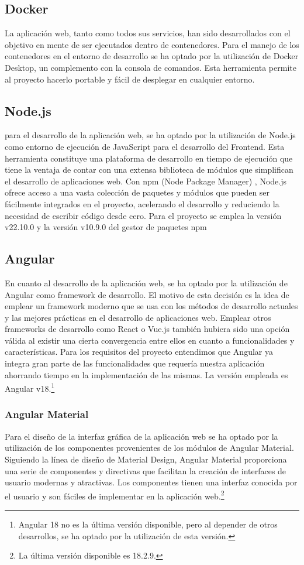 \documentclass[12pt, a4paper, twoside]{article}
\begin{document}
\subsection{Docker}
La aplicación web, tanto como todos sus servicios, han sido desarrollados con el objetivo en mente de ser ejecutados dentro de contenedores.
Para el manejo de los contenedores en el entorno de desarrollo se ha optado por la utilización de Docker Desktop, un complemento con la consola de comandos.
Esta herramienta permite al proyecto hacerlo portable y fácil de desplegar en cualquier entorno.
\subsection{Node.js}
\cite{nodejs}
para el desarrollo de la aplicación web, se ha optado por la utilización de Node.js como entorno de ejecución de JavaScript para el desarrollo del Frontend.
Esta herramienta constituye una plataforma de desarrollo en tiempo de ejecución que tiene la ventaja de contar con una extensa biblioteca de módulos que simplifican el desarrollo de aplicaciones web.
Con npm (Node Package Manager) \cite{npm}, Node.js ofrece acceso a una vasta colección de paquetes y módulos que pueden ser fácilmente integrados en el proyecto, acelerando el desarrollo y reduciendo la necesidad de escribir código desde cero.
Para el proyecto se emplea la versión v22.10.0 y la versión v10.9.0 del gestor de paquetes npm
\subsection{Angular}
\cite{angular}
En cuanto al desarrollo de la aplicación web, se ha optado por la utilización de Angular como framework de desarrollo.
El motivo de esta decisión es la idea de emplear un framework moderno que se usa con los métodos de desarrollo actuales y las mejores prácticas en el desarrollo de aplicaciones web.
Emplear otros frameworks de desarrollo como React o Vue.js también hubiera sido una opción válida al existir una cierta convergencia entre ellos en cuanto a funcionalidades y características.
Para los requisitos del proyecto entendimos que Angular ya integra gran parte de las funcionalidades que requería nuestra aplicación ahorrando tiempo en la implementación de las mismas. La versión empleada es Angular v18.\footnote{Angular 18 no es la última versión disponible, pero al depender de otros desarrollos, se ha optado por la utilización de esta versión.}
\subsubsection{Angular Material}
\cite{angular_material}
Para el diseño de la interfaz gráfica de la aplicación web se ha optado por la utilización de los componentes provenientes de los módulos de Angular Material.
Siguiendo la línea de diseño de Material Design, Angular Material proporciona una serie de componentes y directivas que facilitan la creación de interfaces de usuario modernas y atractivas.
Los componentes tienen una interfaz conocida por el usuario y son fáciles de implementar en la aplicación web.\footnote{La última versión disponible es 18.2.9.}
\end{document}
